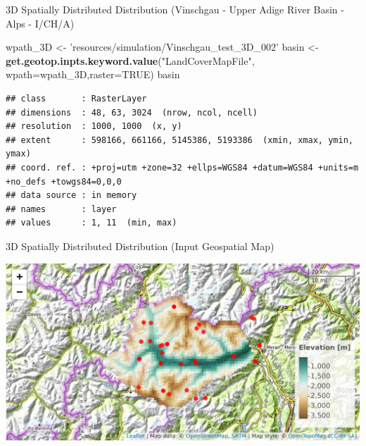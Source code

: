 \documentclass[ignorenonframetext,]{beamer}
\newenvironment{Shaded}{\begin{snugshade}}{\end{snugshade}}
\newcommand{\KeywordTok}[1]{\textcolor[rgb]{0.13,0.29,0.53}{\textbf{#1}}}
\newcommand{\DataTypeTok}[1]{\textcolor[rgb]{0.13,0.29,0.53}{#1}}
\newcommand{\StringTok}[1]{\textcolor[rgb]{0.31,0.60,0.02}{#1}}
\newcommand{\OtherTok}[1]{\textcolor[rgb]{0.56,0.35,0.01}{#1}}
\newcommand{\NormalTok}[1]{#1}
\begin{document}
\begin{frame}[fragile]{3D Spatially Distributed Distribution (Vinschgau
- Upper Adige River Basin - Alps - I/CH/A)}

\begin{Shaded}
\begin{Highlighting}[]
\NormalTok{wpath_3D <-}\StringTok{ 'resources/simulation/Vinschgau_test_3D_002'}
\NormalTok{basin <-}\StringTok{ }\KeywordTok{get.geotop.inpts.keyword.value}\NormalTok{(}\StringTok{"LandCoverMapFile"}\NormalTok{,}
              \DataTypeTok{wpath=}\NormalTok{wpath_3D,}\DataTypeTok{raster=}\OtherTok{TRUE}\NormalTok{)}
\NormalTok{basin}
\end{Highlighting}
\end{Shaded}

\begin{verbatim}
## class       : RasterLayer 
## dimensions  : 48, 63, 3024  (nrow, ncol, ncell)
## resolution  : 1000, 1000  (x, y)
## extent      : 598166, 661166, 5145386, 5193386  (xmin, xmax, ymin, ymax)
## coord. ref. : +proj=utm +zone=32 +ellps=WGS84 +datum=WGS84 +units=m +no_defs +towgs84=0,0,0 
## data source : in memory
## names       : layer 
## values      : 1, 11  (min, max)
\end{verbatim}

\end{frame}

\begin{frame}{3D Spatially Distributed Distribution (Input Geospatial
Map)}

\includegraphics{presentation_files/figure-beamer/unnamed-chunk-13-1.pdf}

\end{frame}
\end{document}
